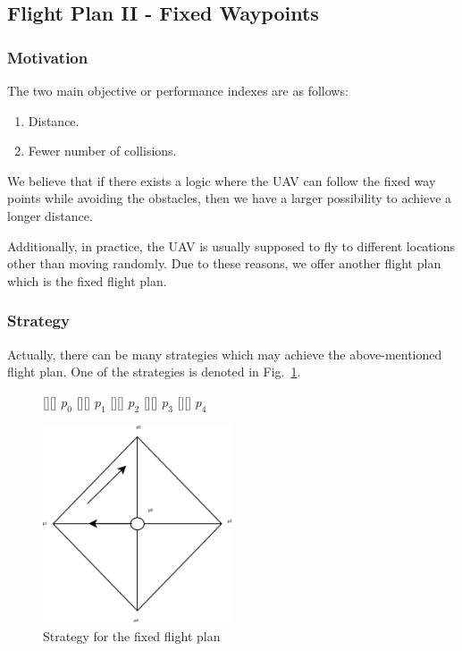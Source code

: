 \subsection{Flight Plan II - Fixed Waypoints}


\subsubsection{Motivation}
The two main objective or performance indexes are as follows:
\begin{enumerate}
\item Distance.
\item Fewer number of collisions.
\end{enumerate}

We believe that if there exists a logic where the \ac{UAV} can follow the fixed way points while avoiding the obstacles, then we have a larger possibility to achieve a longer distance. 

Additionally, in practice, the \ac{UAV} is usually supposed to fly to different locations other than moving randomly. Due to these reasons, we offer another flight plan which is the fixed flight plan.


\subsubsection{Strategy}
Actually, there can be many strategies which may achieve the above-mentioned flight plan. One of the strategies is denoted in Fig.~\ref{f:fp}.

\begin{figure}
\centering
{} 		[][]  {$p_0$}
 		[][]  {$p_1$}
 		[][]  {$p_2$}
 		[][]  {$p_3$}
 		[][]  {$p_4$}

\includegraphics[width= 0.5\textwidth]{figures/fp.eps}
\caption{Strategy for the fixed flight plan}
\label{f:fp}
\end{figure}

